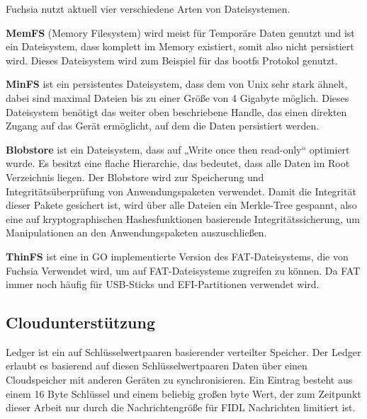 \documentclass[a4paper]{scrartcl}
\begin{document}
Fuchsia nutzt aktuell vier verschiedene Arten von Dateisystemen.

\textbf{MemFS} (Memory Filesystem) wird meist für Temporäre Daten genutzt und ist ein Dateisystem, dass komplett im Memory existiert, somit also nicht persistiert wird. Dieses Dateisystem wird zum Beispiel für das bootfs Protokol genutzt.

\textbf{MinFS} ist ein persistentes Dateisystem, dass dem von Unix sehr stark ähnelt, dabei sind maximal Dateien bis zu einer Größe von 4 Gigabyte möglich. Dieses Dateisystem benötigt das weiter oben beschriebene Handle, das einen direkten Zugang auf das Gerät ermöglicht, auf dem die Daten persistiert werden.

\textbf{Blobstore} ist ein Dateisystem, dass auf „Write once then read-only“ optimiert wurde. Es besitzt eine flache Hierarchie, das bedeutet, dass alle Daten im Root Verzeichnis liegen. Der Blobstore wird zur Speicherung und Integritätsüberprüfung von Anwendungspaketen verwendet. Damit die Integrität dieser Pakete gesichert ist, wird über alle Dateien ein Merkle-Tree gespannt, also eine auf kryptographischen Hashesfunktionen basierende Integritätssicherung, um Manipulationen an den Anwendungspaketen auszuschließen.

\textbf{ThinFS} ist eine in GO implementierte Version des FAT-Dateisystems, die von Fuchsia Verwendet wird, um auf FAT-Dateisysteme zugreifen zu können. Da FAT immer noch häufig für USB-Sticks und EFI-Partitionen verwendet wird.
\subsection{Cloudunterstützung}
Ledger ist ein auf Schlüsselwertpaaren basierender verteilter Speicher. Der Ledger erlaubt es basierend auf diesen Schlüsselwertpaaren Daten über einen Cloudspeicher mit anderen Geräten zu synchronisieren. Ein Eintrag besteht aus einem 16 Byte Schlüssel und einem beliebig großen byte Wert, der zum Zeitpunkt dieser Arbeit nur durch die Nachrichtengröße für FIDL Nachrichten limitiert ist.
\end{document}
